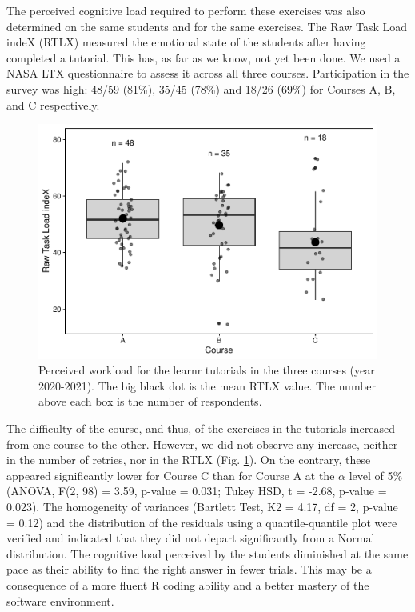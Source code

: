 \documentclass{aims}
\theoremstyle{definition}
\begin{document}
The perceived cognitive load required to perform these exercises was
also determined on the same students and for the same exercises. The Raw
Task Load indeX (RTLX) measured the emotional state of the students
after having completed a tutorial. This has, as far as we know, not yet
been done. We used a NASA LTX questionnaire to assess it across all
three courses. Participation in the survey was high: 48/59 (81\%), 35/45
(78\%) and 18/26 (69\%) for Courses A, B, and C respectively.

\begin{figure}
\includegraphics[width=1\linewidth]{teaching_data_science_files/figure-latex/fig_rtlx-1} \caption{\label{fig:fig_rtlx} Perceived workload for the learnr tutorials in the three courses (year 2020-2021). The big black dot is the mean RTLX value. The number above each box is the number of respondents.}\label{fig:fig_rtlx}
\end{figure}

The difficulty of the course, and thus, of the exercises in the
tutorials increased from one course to the other. However, we did not
observe any increase, neither in the number of retries, nor in the RTLX
(Fig. \ref {fig:fig_rtlx}). On the contrary, these appeared
significantly lower for Course C than for Course A at the \(\alpha\)
level of 5\% (ANOVA, F(2, 98) = 3.59, p-value = 0.031; Tukey HSD, t =
-2.68, p-value = 0.023). The homogeneity of variances (Bartlett Test, K2
= 4.17, df = 2, p-value = 0.12) and the distribution of the residuals
using a quantile-quantile plot were verified and indicated that they did
not depart significantly from a Normal distribution. The cognitive load
perceived by the students diminished at the same pace as their ability
to find the right answer in fewer trials. This may be a consequence of a
more fluent R coding ability and a better mastery of the software
environment.
\end{document}
